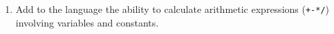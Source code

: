 \begin{enumerate}
\item Add to the language the ability to calculate arithmetic expressions (\texttt{+-*/}) involving variables and constants.
\end{enumerate}